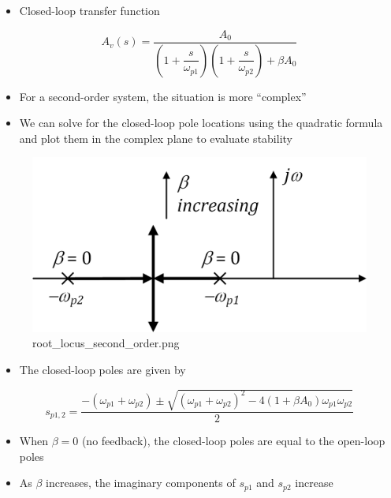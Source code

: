 \documentclass[11pt]{article}
\providecommand{\tightlist}{%
      \setlength{\itemsep}{0pt}\setlength{\parskip}{0pt}}
\begin{document}
\begin{itemize}
\tightlist
\item
  Closed-loop transfer function
\end{itemize}

\begin{equation}
A_v(s) = \dfrac{A_0}{\left(1+\dfrac{s}{\omega_{p1}} \right) \left(1+\dfrac{s}{\omega_{p2}} \right) + \beta A_0}
\end{equation}

    \begin{itemize}
\item
  For a second-order system, the situation is more ``complex''
\item
  We can solve for the closed-loop pole locations using the quadratic
  formula and plot them in the complex plane to evaluate stability
\end{itemize}

    \begin{figure}
\centering
\includegraphics{root_locus_second_order.png}
\caption{root\_locus\_second\_order.png}
\end{figure}

    \begin{itemize}
\tightlist
\item
  The closed-loop poles are given by
\end{itemize}

\begin{equation}
s_{p1,2} = \dfrac{-(\omega_{p1} + \omega_{p2})\pm \sqrt{(\omega_{p1}+\omega_{p2})^2 - 4(1+\beta A_0)\omega_{p1} \omega_{p2}}}{2}
\end{equation}

\begin{itemize}
\tightlist
\item
  When \(\beta = 0\) (no feedback), the closed-loop poles are equal to
  the open-loop poles
\item
  As \(\beta\) increases, the imaginary components of \(s_{p1}\) and
  \(s_{p2}\) increase
\end{itemize}
\end{document}
